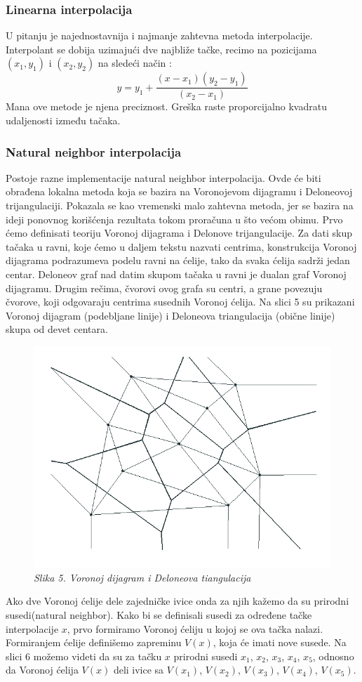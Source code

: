\documentclass[12pt]{article}
\begin{document}
\subsubsection{Linearna interpolacija}
U pitanju je najednostavnija i najmanje zahtevna metoda interpolacije. Interpolant se dobija uzimajući dve najbliže tačke, recimo na pozicijama $(x_{1},y_{1})$ i $(x_{2},y_{2})$ na sledeći način : 
\begin{equation}\label{key}
y= y_{1}+ \frac{(x-x_{1})(y_{2}-y_{1})}{(x_{2}-x_{1})}
\end{equation}
Mana ove metode je njena preciznost. Greška raste proporcijalno kvadratu udaljenosti između tačaka.
\subsubsection{Natural neighbor interpolacija}
Postoje razne implementacije natural neighbor interpolacija. Ovde će biti obrađena lokalna metoda koja se bazira na Voronojevom dijagramu i Deloneovoj trijangulaciji. Pokazala se kao vremenski malo zahtevna metoda, jer se bazira na ideji ponovnog korišćenja rezultata tokom proračuna u što većom obimu. Prvo ćemo definisati teoriju Voronoj dijagrama i Delonove trijangulacije.
Za dati skup tačaka u ravni, koje ćemo u daljem tekstu nazvati centrima, konstrukcija Voronoj dijagrama podrazumeva podelu ravni na ćelije, tako da svaka ćelija sadrži jedan centar. Deloneov graf nad datim skupom tačaka u ravni je dualan graf Voronoj dijagramu. Drugim rečima, čvorovi ovog grafa su centri, a grane povezuju čvorove, koji odgovaraju centrima susednih Voronoj ćelija. Na slici 5 su prikazani
Voronoj dijagram (podebljane linije) i Deloneova triangulacija (obične linije) skupa od devet centara.
\begin{figure}[h!]
	\centering
	\includegraphics[width=0.5\linewidth]{vor.png}
	\caption*{\textsl{Slika 5. Voronoj dijagram i Deloneova tiangulacija}}
\end{figure} 
Ako dve Voronoj ćelije dele zajedničke ivice onda za njih kažemo da su prirodni susedi(natural neighbor). Kako bi se definisali susedi za određene tačke interpolacije $x$, prvo formiramo Voronoj ćeliju u kojoj se ova tačka nalazi. Formiranjem ćelije definišemo zapreminu $V(x)$, koja će imati nove susede. Na slici 6 možemo videti da su za tačku $x$ prirodni susedi $x_{1}$, $x_{2}$, $x_{3}$, $x_{4}$, $x_{5}$, odnosno da Voronoj ćelija $V(x)$ deli ivice sa $V(x_1)$, $V(x_2)$, $V(x_3)$, $V(x_4)$, $V(x_5)$.    
\end{document}
